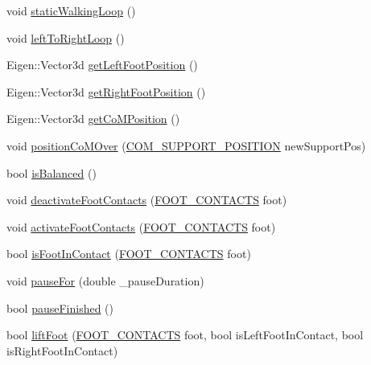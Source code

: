 \begin{DoxyCompactItemize}
\item 
void \hyperlink{classSteppingDemoClient_a0f6b689c5f032351484b03e71a3530e1}{static\-Walking\-Loop} ()
\item 
void \hyperlink{classSteppingDemoClient_a94b990ae53b1b40ef8f9469b427d171c}{left\-To\-Right\-Loop} ()
\item 
\-Eigen\-::\-Vector3d \hyperlink{classSteppingDemoClient_af6a814243828f5136476aa5e99ea0079}{get\-Left\-Foot\-Position} ()
\item 
\-Eigen\-::\-Vector3d \hyperlink{classSteppingDemoClient_ae9c0d72756c109f49c269a7e1b06454a}{get\-Right\-Foot\-Position} ()
\item 
\-Eigen\-::\-Vector3d \hyperlink{classSteppingDemoClient_a857aa530a4ab94443d0b0869121baf76}{get\-Co\-M\-Position} ()
\item 
void \hyperlink{classSteppingDemoClient_a18609e5634a283423c228106bb0e3a45}{position\-Co\-M\-Over} (\hyperlink{SteppingDemoClient_8h_ac0c3848a609566394821d9826e0fdd5b}{\-C\-O\-M\-\_\-\-S\-U\-P\-P\-O\-R\-T\-\_\-\-P\-O\-S\-I\-T\-I\-O\-N} new\-Support\-Pos)
\item 
bool \hyperlink{classSteppingDemoClient_ad8fbc186267a47a73bb77e78199f2b8c}{is\-Balanced} ()
\item 
void \hyperlink{classSteppingDemoClient_a62b5028bdc99de117cfffc576478a0f1}{deactivate\-Foot\-Contacts} (\hyperlink{SteppingDemoClient_8h_ab0673d7f17cdd57b8fa124abb330287f}{\-F\-O\-O\-T\-\_\-\-C\-O\-N\-T\-A\-C\-T\-S} foot)
\item 
void \hyperlink{classSteppingDemoClient_abf583698c8c03620516acf3ec6eb9e41}{activate\-Foot\-Contacts} (\hyperlink{SteppingDemoClient_8h_ab0673d7f17cdd57b8fa124abb330287f}{\-F\-O\-O\-T\-\_\-\-C\-O\-N\-T\-A\-C\-T\-S} foot)
\item 
bool \hyperlink{classSteppingDemoClient_aeeaa9fac47e3e5a141647b07fa2feaa3}{is\-Foot\-In\-Contact} (\hyperlink{SteppingDemoClient_8h_ab0673d7f17cdd57b8fa124abb330287f}{\-F\-O\-O\-T\-\_\-\-C\-O\-N\-T\-A\-C\-T\-S} foot)
\item 
void \hyperlink{classSteppingDemoClient_a6b5d8bf0ce08c8b9f66ac2c1bbd5bcd7}{pause\-For} (double \-\_\-pause\-Duration)
\item 
bool \hyperlink{classSteppingDemoClient_afe78b799d8b8c63cff7d1e8765b7e1fa}{pause\-Finished} ()
\item 
bool \hyperlink{classSteppingDemoClient_ae406e5c8f755f234272b63de4d6a774f}{lift\-Foot} (\hyperlink{SteppingDemoClient_8h_ab0673d7f17cdd57b8fa124abb330287f}{\-F\-O\-O\-T\-\_\-\-C\-O\-N\-T\-A\-C\-T\-S} foot, bool is\-Left\-Foot\-In\-Contact, bool is\-Right\-Foot\-In\-Contact)

\end{DoxyCompactItemize}
